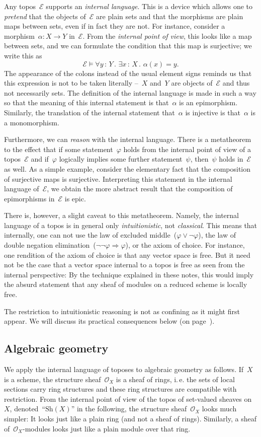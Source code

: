 \documentclass[10pt]{amsart}
\makeatletter
\theoremstyle{definition}
\theoremstyle{plain}
\theoremstyle{remark}
\newcommand{\E}{\mathcal{E}}
\renewcommand{\O}{\mathcal{O}}
\newcommand{\Sh}{\mathrm{Sh}}
\newcommand{\?}{\,{:}\,}
\renewcommand{\_}{\mathpunct{.}\,}
\newcommand{\ie}{i.\,e.\@\xspace}
\makeatother
\begin{document}
Any topos~$\E$ supports an \emph{internal language}. This is a device which
allows one to \emph{pretend} that the objects of~$\E$ are plain sets and that
the morphisms are plain maps between sets, even if in fact they are not. For
instance, consider a morphism~$\alpha : X \to Y$ in~$\E$. From the \emph{internal
point of view}, this looks like a map between sets, and we can formulate the
condition that this map is surjective; we write this as
\[ \E \models \forall y\?Y\_ \exists x\?X\_ \alpha(x) = y. \]
The appearance of the colons instead of the usual element signs reminds us that
this expression is not to be taken literally --~$X$ and~$Y$ are objects of~$\E$
and thus not necessarily sets. The definition of the internal language is made
in such a way so that the meaning of this internal statement is that~$\alpha$
is an epimorphism. Similarly, the translation of the internal statement
that~$\alpha$ is injective is that~$\alpha$ is a monomorphism.

Furthermore, we can \emph{reason} with the internal language. There is a
metatheorem to the effect that if some statement~$\varphi$ holds from the
internal point of view of a topos~$\E$ and if~$\varphi$ logically implies some
further statement~$\psi$, then~$\psi$ holds in~$\E$ as well. As a simple
example, consider the elementary fact that the composition of surjective maps
is surjective. Interpreting this statement in the internal language of~$\E$, we
obtain the more abstract result that the composition of epimorphisms in~$\E$ is
epic.

There is, however, a slight caveat to this metatheorem. Namely, the internal
language of a topos is in general only \emph{intuitionistic}, not
\emph{classical}. This means that internally, one can not use the law of
excluded middle~($\varphi \vee \neg\varphi$), the law of double negation
elimination~($\neg\neg\varphi \Rightarrow \varphi$), or the axiom of choice.
For instance, one rendition of the axiom of choice is that any vector space is
free. But it need not be the case that a vector space internal to a topos
is free as seen from the internal perspective: By the technique explained in
these notes, this would imply the absurd statement that any sheaf of modules on
a reduced scheme is locally free.

The restriction to intuitionistic reasoning is not as confining as it might first
appear. We will discuss its practical consequences below (on
page~\pageref{sect:appreciating-intuitionistic-logic}).


\subsection*{Algebraic geometry}
We apply the internal language of toposes to algebraic geometry as follows. If~$X$ is a
scheme, the structure sheaf~$\O_X$ is a sheaf of rings, \ie the sets of
local sections carry ring structures and these ring structures are compatible
with restriction. From the internal point of view of the topos of set-valued
sheaves on~$X$, denoted~``$\Sh(X)$'' in the following, the structure
sheaf~$\O_X$ looks much simpler: It looks just like a plain ring (and
not a sheaf of rings). Similarly, a sheaf of~$\O_X$-modules looks just like a
plain module over that ring.
\end{document}
